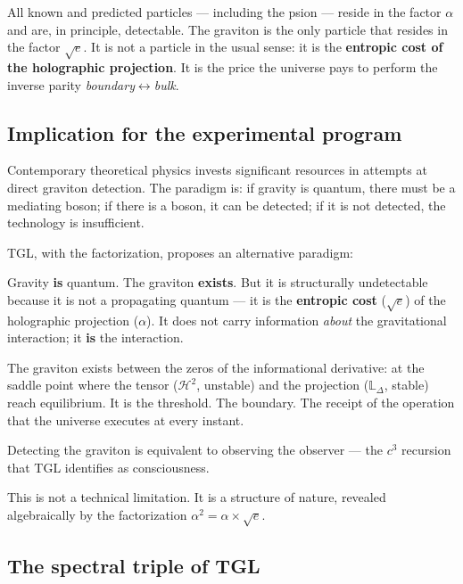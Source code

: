 \documentclass[12pt,a4paper,twoside]{article}
\newcommand{\alphaii}{\alpha^{2}}
\newcommand{\boundary}{\textit{boundary}}
\newcommand{\bulk}{\textit{bulk}}
\begin{document}
\noindent All known and predicted particles --- including the psion --- reside in the factor $\alpha$ and are, in principle, detectable. The graviton is the only particle that resides in the factor $\sqrt{e}$. It is not a particle in the usual sense: it is the \textbf{entropic cost of the holographic projection}. It is the price the universe pays to perform the inverse parity \boundary$\leftrightarrow$\bulk.

\subsection{Implication for the experimental program}

Contemporary theoretical physics invests significant resources in attempts at direct graviton detection. The paradigm is: if gravity is quantum, there must be a mediating boson; if there is a boson, it can be detected; if it is not detected, the technology is insufficient.

TGL, with the factorization, proposes an alternative paradigm:

\begin{conclusionbox}[title={TGL Paradigm for the Graviton}]
Gravity \textbf{is} quantum. The graviton \textbf{exists}. But it is structurally undetectable because it is not a propagating quantum --- it is the \textbf{entropic cost} ($\sqrt{e}$) of the holographic projection ($\alpha$). It does not carry information \textit{about} the gravitational interaction; it \textbf{is} the interaction.

\medskip
The graviton exists between the zeros of the informational derivative: at the saddle point where the tensor ($\mathcal{H}^2$, unstable) and the projection ($\mathbb{L}_\Delta$, stable) reach equilibrium. It is the threshold. The boundary. The receipt of the operation that the universe executes at every instant.

\medskip
Detecting the graviton is equivalent to observing the observer --- the $c^3$ recursion that TGL identifies as consciousness.
\end{conclusionbox}

This is not a technical limitation. It is a structure of nature, revealed algebraically by the factorization $\alphaii = \alpha \times \sqrt{e}$.


\subsection{The spectral triple of TGL}
\label{subsec:tripla}
\end{document}
